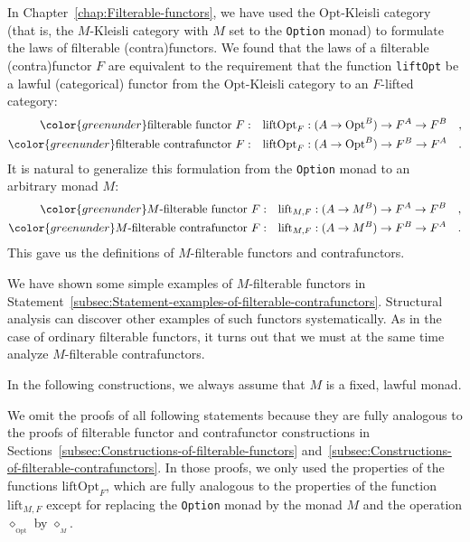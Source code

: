 In Chapter~\ref{chap:Filterable-functors}, we have used the $\text{Opt}$-Kleisli
category (that is, the $M$-Kleisli category with $M$ set to the
\lstinline!Option! monad) to formulate the laws of filterable (contra)functors.
We found that the laws of a filterable (contra)functor $F$ are equivalent
to the requirement that the function \lstinline!liftOpt! be a lawful
(categorical) functor from the $\text{Opt}$-Kleisli category to an
$F$-lifted category:
\begin{align*}
{\color{greenunder}\text{filterable functor }F:}\quad & \text{liftOpt}_{F}:(A\rightarrow\text{Opt}^{B})\rightarrow F^{A}\rightarrow F^{B}\quad,\\
{\color{greenunder}\text{filterable contrafunctor }F:}\quad & \text{liftOpt}_{F}:(A\rightarrow\text{Opt}^{B})\rightarrow F^{B}\rightarrow F^{A}\quad.
\end{align*}
It is natural to generalize this formulation from the \lstinline!Option!
monad to an arbitrary monad $M$:
\begin{align*}
{\color{greenunder}M\text{-filterable functor }F:}\quad & \text{lift}_{M,F}:(A\rightarrow M^{B})\rightarrow F^{A}\rightarrow F^{B}\quad,\\
{\color{greenunder}M\text{-filterable contrafunctor }F:}\quad & \text{lift}_{M,F}:(A\rightarrow M^{B})\rightarrow F^{B}\rightarrow F^{A}\quad.
\end{align*}
 This gave us the definitions of $M$-filterable functors and contrafunctors.

We have shown some simple examples of $M$-filterable functors in
Statement~\ref{subsec:Statement-examples-of-filterable-contrafunctors}.
Structural analysis can discover other examples of such functors systematically.
As in the case of ordinary filterable functors, it turns out that
we must at the same time analyze $M$-filterable contrafunctors.

In the following constructions, we always assume that $M$ is a fixed,
lawful monad.

We omit the proofs of all following statements because they are fully
analogous to the proofs of filterable functor and contrafunctor constructions
in Sections~\ref{subsec:Constructions-of-filterable-functors} and~\ref{subsec:Constructions-of-filterable-contrafunctors}.
In those proofs, we only used the properties of the functions $\text{liftOpt}_{F}$,
which are fully analogous to the properties of the function $\text{lift}_{M,F}$
except for replacing the \lstinline!Option! monad by the monad $M$
and the operation $\diamond_{_{\text{Opt}}}$ by $\diamond_{_{M}}$.

